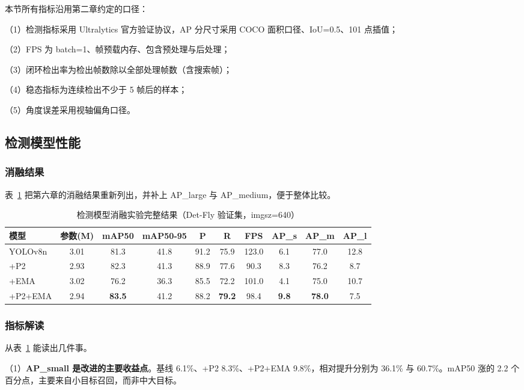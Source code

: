 本节所有指标沿用第二章约定的口径：

（1）检测指标采用 Ultralytics 官方验证协议，AP 分尺寸采用 COCO 面积口径、IoU=0.5、101 点插值；

（2）FPS 为 batch=1、帧预载内存、包含预处理与后处理；

（3）闭环检出率为检出帧数除以全部处理帧数（含搜索帧）；

（4）稳态指标为连续检出不少于 5 帧后的样本；

（5）角度误差采用视轴偏角口径。

\subsection{检测模型性能}

\subsubsection{消融结果}

表~\ref{tab:exp_ablation} 把第六章的消融结果重新列出，并补上 AP\_large 与 AP\_medium，便于整体比较。

\begin{table}[htbp]
\centering
\caption{检测模型消融实验完整结果（Det-Fly 验证集，imgsz=640）}
\label{tab:exp_ablation}
\small
\begin{tabular}{lccccccccc}
\toprule
\textbf{模型} & \textbf{参数(M)} & \textbf{mAP50} & \textbf{mAP50-95} & \textbf{P} & \textbf{R} & \textbf{FPS} & \textbf{AP\_s} & \textbf{AP\_m} & \textbf{AP\_l} \\
\midrule
YOLOv8n & 3.01 & 81.3 & 41.8 & 91.2 & 75.9 & 123.0 & 6.1 & 77.0 & 12.8 \\
+P2 & 2.93 & 82.3 & 41.3 & 88.9 & 77.6 & 90.3 & 8.3 & 76.2 & 8.7 \\
+EMA & 3.02 & 76.2 & 36.3 & 85.5 & 72.2 & 101.0 & 4.1 & 75.0 & 10.7 \\
+P2+EMA & 2.94 & \textbf{83.5} & 41.2 & 88.2 & \textbf{79.2} & 98.4 & \textbf{9.8} & \textbf{78.0} & 7.5 \\
\bottomrule
\end{tabular}
\end{table}

\subsubsection{指标解读}

从表~\ref{tab:exp_ablation} 能读出几件事。

（1）\textbf{AP\_small 是改进的主要收益点}。基线 6.1\%、+P2 8.3\%、+P2+EMA 9.8\%，相对提升分别为 36.1\% 与 60.7\%。mAP50 涨的 2.2 个百分点，主要来自小目标召回，而非中大目标。

